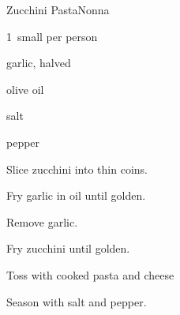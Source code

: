 \begin{recipe}{Zucchini Pasta}{Nonna}{}

\begin{ingredients}
\item 1~small  per person
\item garlic, halved
\item olive oil
\item salt
\item pepper
\item {}
\end{ingredients}

\begin{directions}
\item Slice zucchini into thin coins.
\item Fry garlic in oil until golden.
\item Remove garlic.
\item Fry zucchini until golden.
\item Toss with cooked pasta and cheese
\item Season with salt and pepper.
\end{directions}

\end{recipe}
